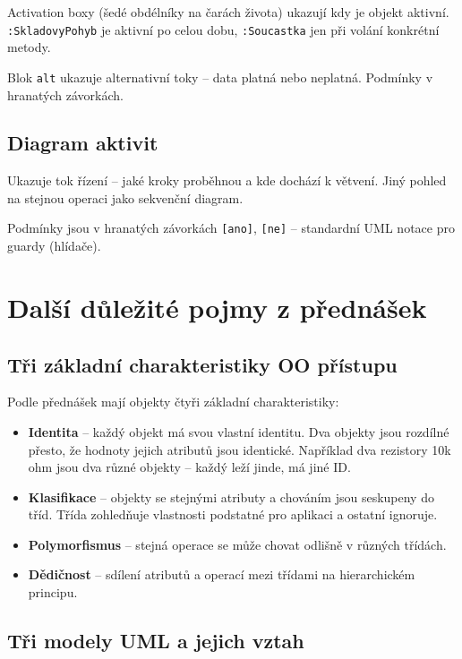 \documentclass[12pt, a4paper]{article}
\begin{document}
Activation boxy (šedé obdélníky na čarách života) ukazují kdy je objekt aktivní. \texttt{:SkladovyPohyb} je aktivní po celou dobu, \texttt{:Soucastka} jen při volání konkrétní metody.

Blok \texttt{alt} ukazuje alternativní toky -- data platná nebo neplatná. Podmínky v hranatých závorkách.

\subsection{Diagram aktivit}

Ukazuje tok řízení -- jaké kroky proběhnou a kde dochází k větvení. Jiný pohled na stejnou operaci jako sekvenční diagram.

Podmínky jsou v hranatých závorkách \texttt{[ano]}, \texttt{[ne]} -- standardní UML notace pro guardy (hlídače).


\section{Další důležité pojmy z přednášek}

\subsection{Tři základní charakteristiky OO přístupu}

Podle přednášek mají objekty čtyři základní charakteristiky:
\begin{itemize}
  \item \textbf{Identita} -- každý objekt má svou vlastní identitu. Dva objekty jsou rozdílné přesto, že hodnoty jejich atributů jsou identické. Například dva rezistory 10k ohm jsou dva různé objekty -- každý leží jinde, má jiné ID.
  \item \textbf{Klasifikace} -- objekty se stejnými atributy a chováním jsou seskupeny do tříd. Třída zohledňuje vlastnosti podstatné pro aplikaci a ostatní ignoruje.
  \item \textbf{Polymorfismus} -- stejná operace se může chovat odlišně v různých třídách.
  \item \textbf{Dědičnost} -- sdílení atributů a operací mezi třídami na hierarchickém principu.
\end{itemize}

\subsection{Tři modely UML a jejich vztah}
\end{document}
